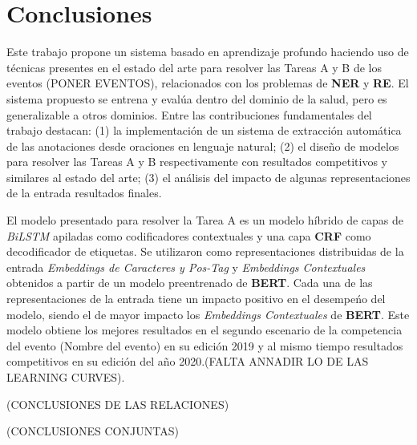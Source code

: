 \chapter*{Conclusiones}\label{chapter:conclusions}

Este trabajo propone un sistema basado en aprendizaje profundo haciendo uso de t\'ecnicas presentes en el estado del arte para resolver las Tareas A y B de los eventos (PONER EVENTOS), relacionados con los problemas de \textbf{NER} y \textbf{RE}. El sistema propuesto se entrena y eval\'ua dentro del dominio de la salud, pero es generalizable a otros dominios. Entre las contribuciones fundamentales del trabajo destacan: (1) la implementaci\'on de un sistema de extracci\'on autom\'atica de las anotaciones desde oraciones en lenguaje natural; (2) el dise\~no de modelos para resolver las Tareas A y B respectivamente con resultados competitivos y similares al estado del arte; (3) el an\'alisis del impacto de algunas representaciones de la entrada resultados finales. 

El modelo presentado para resolver la Tarea A es un modelo h\'ibrido de capas de \emph{BiLSTM} apiladas como codificadores contextuales y una capa \textbf{CRF} como decodificador de etiquetas. Se utilizaron como representaciones distribuidas de la entrada \emph{Embeddings de Caracteres y Pos-Tag} y \emph{Embeddings Contextuales} obtenidos a partir de un modelo preentrenado de \textbf{BERT}. Cada una de las representaciones de la entrada tiene un impacto positivo en el desempe\'no del modelo, siendo el de mayor impacto los \emph{Embeddings Contextuales} de \textbf{BERT}. Este modelo obtiene los mejores resultados en el segundo escenario de la competencia del evento (Nombre del evento) en su edici\'on 2019 y al mismo tiempo resultados competitivos en su edici\'on del a\~no 2020.(FALTA ANNADIR LO DE LAS LEARNING CURVES).

(CONCLUSIONES DE LAS RELACIONES)

(CONCLUSIONES CONJUNTAS)

  
